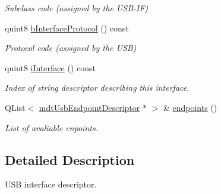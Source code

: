 \begin{DoxyCompactItemize}
\begin{DoxyCompactList}\small\item\em Subclass code (assigned by the USB-\/IF) \end{DoxyCompactList}\item 
\hypertarget{classmdt_usb_interface_descriptor_a9be6f58db4a2fdf1e3a1a0acf1b838f7}{
quint8 \hyperlink{classmdt_usb_interface_descriptor_a9be6f58db4a2fdf1e3a1a0acf1b838f7}{bInterfaceProtocol} () const }
\label{classmdt_usb_interface_descriptor_a9be6f58db4a2fdf1e3a1a0acf1b838f7}

\begin{DoxyCompactList}\small\item\em Protocol code (assigned by the USB) \end{DoxyCompactList}\item 
\hypertarget{classmdt_usb_interface_descriptor_aa975e2dc2a326efe391649c5096286eb}{
quint8 \hyperlink{classmdt_usb_interface_descriptor_aa975e2dc2a326efe391649c5096286eb}{iInterface} () const }
\label{classmdt_usb_interface_descriptor_aa975e2dc2a326efe391649c5096286eb}

\begin{DoxyCompactList}\small\item\em Index of string descriptor describing this interface. \end{DoxyCompactList}\item 
\hypertarget{classmdt_usb_interface_descriptor_a584bd81b092884295f1ebe1e0db55487}{
QList$<$ \hyperlink{classmdt_usb_endpoint_descriptor}{mdtUsbEndpointDescriptor} $\ast$ $>$ \& \hyperlink{classmdt_usb_interface_descriptor_a584bd81b092884295f1ebe1e0db55487}{endpoints} ()}
\label{classmdt_usb_interface_descriptor_a584bd81b092884295f1ebe1e0db55487}

\begin{DoxyCompactList}\small\item\em List of avaliable enpoints. \end{DoxyCompactList}\end{DoxyCompactItemize}


\subsection{Detailed Description}
USB interface descriptor. 

